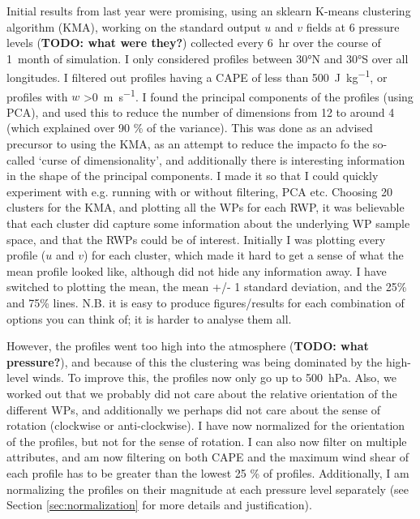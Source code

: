 \documentclass{article}
\newcommand\todo[1]{\textbf{TODO: #1}}
\begin{document}
Initial results from last year were promising, using an sklearn K-means clustering algorithm (KMA), working on the standard output $u$ and $v$ fields at 6 pressure levels (\todo{what were they?}) collected every \SI{6}{hr} over the course of \SI{1}{month} of simulation. I only considered profiles between \ang{30}N and \ang{30}S over all longitudes. I filtered out profiles having a CAPE of less than \SI{500}{J.kg^{-1}}, or profiles with $w$ \textgreater  \SI{0}{m.s^{-1}}. I found the principal components of the profiles (using PCA), and used this to reduce the number of dimensions from 12 to around 4 (which explained over 90 \% of the variance). This was done as an advised precursor to using the KMA, as an attempt to reduce the impacto fo the so-called `curse of dimensionality', and additionally there is interesting information in the shape of the principal components. I made it so that I could quickly experiment with e.g. running with or without filtering, PCA etc. Choosing 20 clusters for the KMA, and plotting all the WPs for each RWP, it was believable that each cluster did capture some information about the underlying WP sample space, and that the RWPs could be of interest. Initially I was plotting every profile ($u$ and $v$) for each cluster, which made it hard to get a sense of what the mean profile looked like, although did not hide any information away. I have switched to plotting the mean, the mean +/- 1 standard deviation, and the 25\% and 75\% lines. N.B. it is easy to produce figures/results for each combination of options you can think of; it is harder to analyse them all. 

However, the profiles went too high into the atmosphere (\todo{what pressure?}), and because of this the clustering was being dominated by the high-level winds. To improve this, the profiles now only go up to \SI{500}{hPa}. Also, we worked out that we probably did not care about the relative orientation of the different WPs, and additionally we perhaps did not care about the sense of rotation (clockwise or anti-clockwise). I have now normalized for the orientation of the profiles, but not for the sense of rotation. I can also now filter on multiple attributes, and am now filtering on both CAPE and the maximum wind shear of each profile has to be greater than the lowest 25 \% of profiles. Additionally, I am normalizing the profiles on their magnitude at each pressure level separately (see Section \ref{sec:normalization} for more details and justification).
\end{document}
